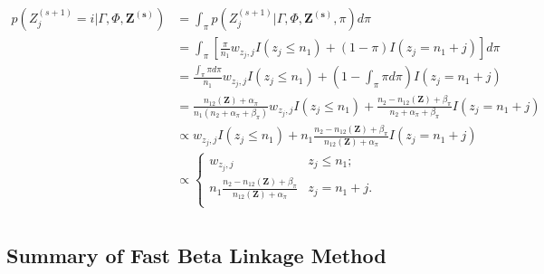 \documentclass[ba]{imsart}
\begin{document}
\begin{align*}
	p\left(Z_j^{(s+1)}  = i| \Gamma, \Phi, \bm{Z^{(s)}}\right) &= \int_{\pi}p(Z_j^{(s+1)} | \Gamma, \Phi, \bm{Z^{(s)}}, \pi) d\pi \\
	&= \int_{\pi}\left[\frac{\pi}{n_1}w_{z_{j}, j} I(z_j\leq n_1) + (1-\pi)I(z_j = n_1 + j)\right]d\pi \\
	&= \frac{\int_{\pi} \pi d\pi}{n_1}w_{z_{j}, j} I(z_j\leq n_1) + \left(1-\int_{\pi} \pi d\pi \right) I(z_j = n_1 + j) \\
	&= \frac{n_{12}(\bm{Z}) + \alpha_{\pi}}{n_1 (n_2 + \alpha_{\pi} + \beta_{\pi})}w_{z_{j}, j} I(z_j\leq n_1) + \frac{n_2 - n_{12}(\bm{Z}) + \beta_{\pi}}{n_2 + \alpha_{\pi} + \beta_{\pi}}I(z_j = n_1 + j) \\
	&\propto w_{z_j, j}I(z_j\leq n_1) + n_1 \frac{n_2 - n_{12}(\bm{Z}) + \beta_{\pi}}{n_{12}(\bm{Z}) + \alpha_{\pi}}I(z_j = n_1 + j) \\
	&\propto 
	\begin{cases} 
		w_{z_j, j}  & z_j \leq n_1; \\
		n_1 \frac{n_2 - n_{12}(\bm{Z}) + \beta_{\pi}}{n_{12}(\bm{Z}) + \alpha_{\pi}} & z_j   = n_1 + j. \\
	\end{cases} \\
\end{align*}

	\clearpage
	
	\hypertarget{app:fabl-psuedocode}{%
		\subsection{Summary of Fast Beta Linkage Method}\label{app:fabl-psuedocode}}
	
\end{document}
